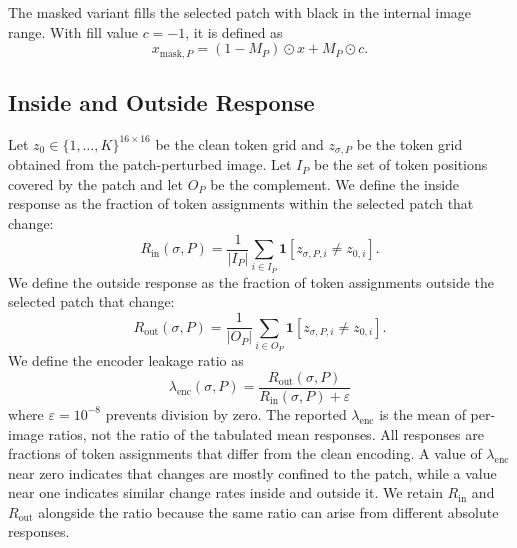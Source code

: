 The masked variant fills the selected patch with black in the internal image
range. With fill value $c=-1$, it is defined as
\begin{equation}
    x_{\mathrm{mask},P}=(1-M_P)\odot x + M_P\odot c.
    \label{eq:rq3_patch_mask}
\end{equation}

\subsection{Inside and Outside Response}
\label{subsec:rq3_inside_outside_metrics}

Let $z_0 \in \{1,\ldots,K\}^{16 \times 16}$ be the clean token grid and $z_{\sigma,P}$ be the token grid obtained from the patch-perturbed image. Let $I_P$ be the set of token positions covered by the patch and let $O_P$ be the complement. We define the inside response as the fraction of token assignments within the selected patch that change:
\begin{equation}
    R_{\mathrm{in}}(\sigma,P)
    =
    \frac{1}{|I_P|}
    \sum_{i \in I_P}
    \mathbf{1}\!\left[z_{\sigma,P,i} \neq z_{0,i}\right].
    \label{eq:rq3_inside_response}
\end{equation}
We define the outside response as the fraction of token assignments outside the selected patch that change:
\begin{equation}
    R_{\mathrm{out}}(\sigma,P)
    =
    \frac{1}{|O_P|}
    \sum_{i \in O_P}
    \mathbf{1}\!\left[z_{\sigma,P,i} \neq z_{0,i}\right].
    \label{eq:rq3_outside_response}
\end{equation}
We define the encoder leakage ratio as
\begin{equation}
    \lambda_{\mathrm{enc}}(\sigma,P)
    =
    \frac{R_{\mathrm{out}}(\sigma,P)}
         {R_{\mathrm{in}}(\sigma,P) + \varepsilon}
    \label{eq:rq3_leakage_ratio}
\end{equation}
where $\varepsilon=10^{-8}$ prevents division by zero. The reported
$\lambda_{\mathrm{enc}}$ is the mean of per-image ratios, not the ratio of the
tabulated mean responses. All responses are fractions of
token assignments that differ from the clean encoding. A value of
$\lambda_{\mathrm{enc}}$ near zero indicates that changes are mostly confined
to the patch, while a value near one indicates similar change rates inside and
outside it. We retain $R_{\mathrm{in}}$ and $R_{\mathrm{out}}$ alongside the
ratio because the same ratio can arise from different absolute responses.

